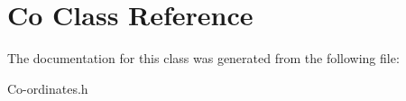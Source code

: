 \hypertarget{class_co}{\section{Co Class Reference}
\label{class_co}
}


The documentation for this class was generated from the following file\-:\begin{DoxyCompactItemize}
\item 
Co-\/ordinates.\-h\end{DoxyCompactItemize}
